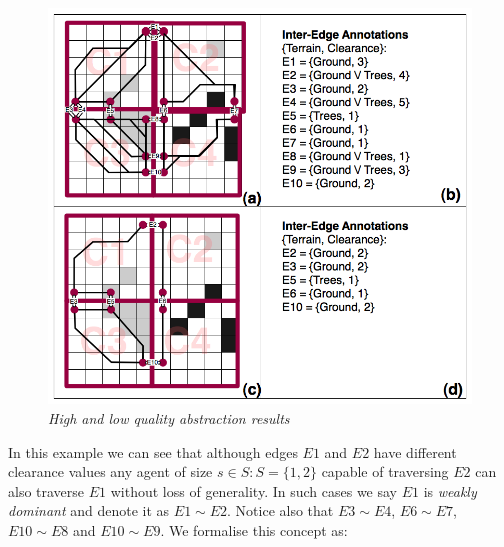 \begin{figure}[htbp]
	\vspace{-12pt}
        \caption{\emph{High and low quality abstraction results} }
        \begin{center}
                        \includegraphics[scale=0.25, trim = 20mm 12mm 20mm 5mm]{diagrams/abstraction_result.png}
        \end{center}
        \label{aha-fig:abstractgraph}
	\vspace{-5pt}
\end{figure}
\par \indent
In this example we can see that although edges $E1$ and $E2$ have different clearance values any agent of size $s \in S : S = \lbrace 1, 2 \rbrace$ capable of traversing $E2$ can also traverse $E1$ without loss of generality. 
In such cases we say $E1$ is \emph{weakly dominant} and denote it as $E1 \sim E2$. 
Notice also that $E3 \sim E4$, $E6 \sim E7$, $E10 \sim E8$ and $E10 \sim E9$.
We formalise this concept as:
